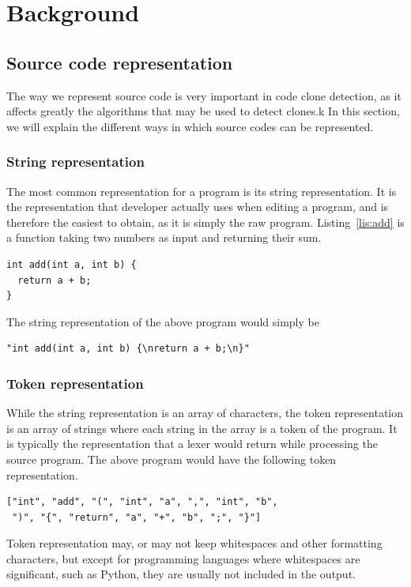 \chapter{\label{ch:background}Background}
\section{\label{sec:code-representation}Source code representation}
The way we represent source code is very important in code clone detection,
as it affects greatly the algorithms that may be used to detect clones.k
In this section, we will explain the different ways in which source codes
can be represented.
\subsection{\label{ssec:string-representation}String representation}
The most common representation for a program is its string representation. It is
the representation that developer actually uses when editing a program, and
is therefore the easiest to obtain, as it is simply the raw program.
Listing~\ref{lis:add} is a function taking two numbers as input and returning
their sum.
\begin{lstlisting}[caption=\lstinline{add} function,label=lis:add]
int add(int a, int b) {
  return a + b;
}
\end{lstlisting}
The string representation of the above program would simply be
\begin{lstlisting}
"int add(int a, int b) {\nreturn a + b;\n}"
\end{lstlisting}
\subsection{\label{ssec:token-representation}Token representation}
While the string representation is an array of characters, the token
representation is an array of strings where each string in the array is a token
of the program. It is typically the representation that a lexer would return
while processing the source program. The above program would have the following
token representation.
\begin{lstlisting}
["int", "add", "(", "int", "a", ",", "int", "b",
 ")", "{", "return", "a", "+", "b", ";", "}"]
\end{lstlisting}
Token representation may, or may not keep whitespaces and other formatting
characters, but except for programming languages where whitespaces are significant,
such as Python, they are usually not included in the output.
